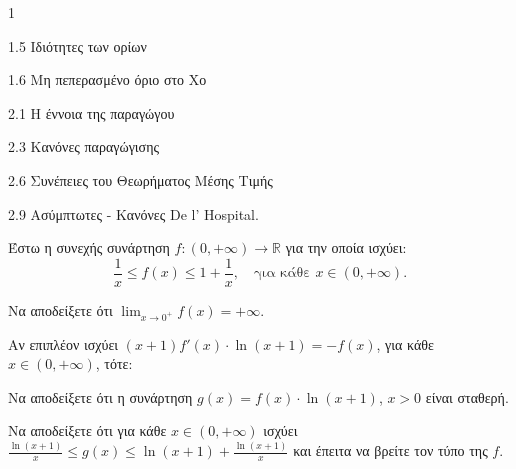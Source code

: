 \begin{ylh}{1}
    \item 1.5 Ιδιότητες των ορίων
    \item 1.6 Μη πεπερασμένο όριο στο Χο
    \item 2.1 Η έννοια της παραγώγου
    \item 2.3 Κανόνες παραγώγισης
    \item 2.6 Συνέπειες του Θεωρήματος Μέσης Τιμής
    \item 2.9 Ασύμπτωτες - Κανόνες De l’ Hospital.
\end{ylh}
Έστω η συνεχής συνάρτηση $f:(0,+\infty) \to \mathbb{R}$ για την οποία ισχύει:
\[ \frac{1}{x} \le f(x) \le 1+\frac{1}{x}, \quad \text{για κάθε } x \in (0,+\infty). \]
\begin{alist}
    \item Να αποδείξετε ότι $\lim_{x \to 0^+} f(x) = +\infty$. 
    \item Αν επιπλέον ισχύει $(x+1)f'(x)\cdot \ln(x+1) = -f(x)$, για κάθε $x \in (0,+\infty)$, τότε:
    \begin{rlist}
        \item Να αποδείξετε ότι η συνάρτηση $g(x)=f(x)\cdot\ln(x+1)$, $x>0$ είναι σταθερή. 
        \item Να αποδείξετε ότι για κάθε $x \in (0,+\infty)$ ισχύει $\frac{\ln(x+1)}{x} \le g(x) \le \ln(x+1) + \frac{\ln(x+1)}{x}$ και έπειτα να βρείτε τον τύπο της $f$. 
    \end{rlist}
\end{alist}